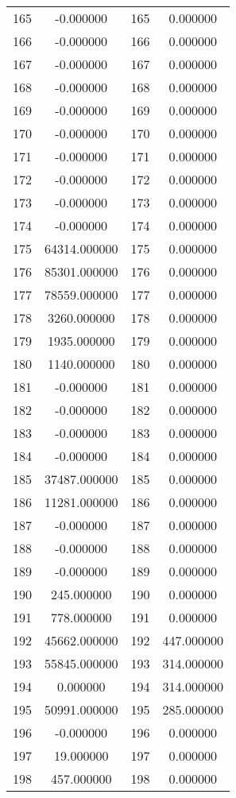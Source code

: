 \documentclass[12pt]{article}
\begin{document}
\begin{longtable}{@{}cccc@{}}
165 & -0.000000 & 165 & 0.000000 \\
166 & -0.000000 & 166 & 0.000000 \\
167 & -0.000000 & 167 & 0.000000 \\
168 & -0.000000 & 168 & 0.000000 \\
169 & -0.000000 & 169 & 0.000000 \\
170 & -0.000000 & 170 & 0.000000 \\
171 & -0.000000 & 171 & 0.000000 \\
172 & -0.000000 & 172 & 0.000000 \\
173 & -0.000000 & 173 & 0.000000 \\
174 & -0.000000 & 174 & 0.000000 \\
175 & 64314.000000 & 175 & 0.000000 \\
176 & 85301.000000 & 176 & 0.000000 \\
177 & 78559.000000 & 177 & 0.000000 \\
178 & 3260.000000 & 178 & 0.000000 \\
179 & 1935.000000 & 179 & 0.000000 \\
180 & 1140.000000 & 180 & 0.000000 \\
181 & -0.000000 & 181 & 0.000000 \\
182 & -0.000000 & 182 & 0.000000 \\
183 & -0.000000 & 183 & 0.000000 \\
184 & -0.000000 & 184 & 0.000000 \\
185 & 37487.000000 & 185 & 0.000000 \\
186 & 11281.000000 & 186 & 0.000000 \\
187 & -0.000000 & 187 & 0.000000 \\
188 & -0.000000 & 188 & 0.000000 \\
189 & -0.000000 & 189 & 0.000000 \\
190 & 245.000000 & 190 & 0.000000 \\
191 & 778.000000 & 191 & 0.000000 \\
192 & 45662.000000 & 192 & 447.000000 \\
193 & 55845.000000 & 193 & 314.000000 \\
194 & 0.000000 & 194 & 314.000000 \\
195 & 50991.000000 & 195 & 285.000000 \\
196 & -0.000000 & 196 & 0.000000 \\
197 & 19.000000 & 197 & 0.000000 \\
198 & 457.000000 & 198 & 0.000000 \\

\end{longtable}
\end{document}
